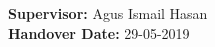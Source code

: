 \begin{titlepage}
\begin{center}





\textbf{Supervisor:} Agus Ismail Hasan \\ %
%
\textbf{Handover Date:} 29-05-2019
\end{center}
\end{titlepage}